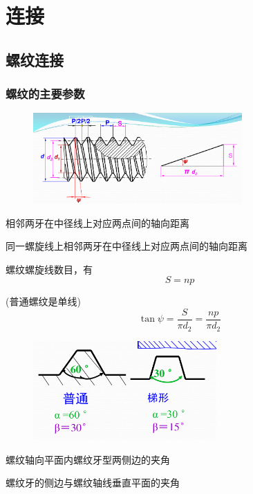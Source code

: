 \documentclass[twocolumn]{ctexart}
\begin{document}
\section{连接}
\subsection{螺纹连接}
\subsubsection{螺纹的主要参数}
        \begin{figure}[H]
            \centering
            \includegraphics[width=8cm]{img/6.png}
            \end{figure}
            \begin{description}[leftmargin=1.7cm,style=nextline,nosep]%
              \item[螺 距 P]  相邻两牙在中径线上对应两点间的轴向距离
              \item[导程 S] 同一螺旋线上相邻两牙在中径线上对应两点间的轴向距离
              \item[线数] 螺纹螺旋线数目，有
              $$
              S=np
              $$
              \item[螺纹升角] (普通螺纹是单线)
              $$ \tan \psi=\frac{S}{\pi d_2}=\frac{np}{\pi d_2}
              $$ 
                      \begin{figure}[H]
                          \centering
                          \includegraphics[width=7cm]{img/7.png}
                          \end{figure}
              \item[牙型角α] 螺纹轴向平面内螺纹牙型两侧边的夹角
              \item[牙侧角β] 螺纹牙的侧边与螺纹轴线垂直平面的夹角
            \end{description}
\end{document}
